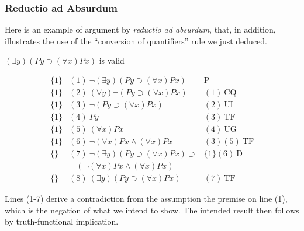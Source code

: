 \subsubsection*{Reductio ad Absurdum}

Here is an example of argument by \emph{reductio ad absurdum}, that, in addition, illustrates the use of the ``conversion of quantifiers'' rule we just deduced.  
\begin{center}
$(\exists y)(Py \supset (\forall x)Px)$ is valid
\end{center}
\[
\begin{array}{lll}
\{1\}   & (1)\ \neg (\exists y)(Py \supset (\forall x)Px)  & \mathrm{P}\\
\{1\}   & (2)\ (\forall y) \neg (Py \supset (\forall x)Px)  & (1)\
\mathrm{CQ}\\ 
\{1\}   & (3)\ \neg (Py \supset (\forall x)Px)  & (2)\ \mathrm{UI}\\
\{1\}   & (4)\ Py  & (3)\ \mathrm{TF}\\
\{1\}   & (5)\ (\forall x)Px  & (4)\ \mathrm{UG}\\
\{1\}   & (6)\ \neg (\forall x)Px \wedge (\forall x)Px  & (3)(5)\ \mathrm{TF}\\
\{\}   & (7)\ \neg (\exists y)(Py \supset (\forall x)Px) \supset & \{1\}(6)\
\mathrm{D}\\ 
  &\ \ \ \ (\neg (\forall x)Px \wedge (\forall x)Px) \\
\{\}   & (8)\ (\exists y)(Py \supset (\forall x)Px)  & (7)\ \mathrm{TF}
\end{array}
\]

Lines (1-7) derive a contradiction from the assumption the premise on line (1), which is the negation of what we intend to show. The intended result then follows by truth-functional implication. 

